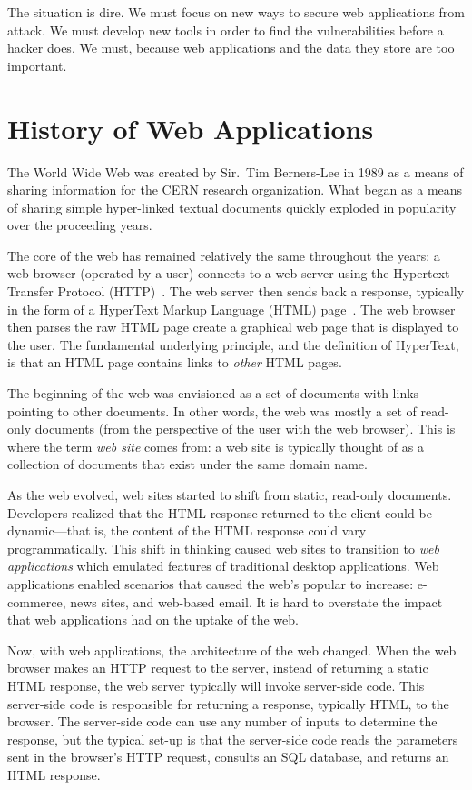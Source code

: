 The situation is dire. We must focus on new ways to secure web
applications from attack. We must develop new tools in order to find
the vulnerabilities before a hacker does. We must, because web
applications and the data they store are too important.

\section{History of Web Applications}

The World Wide Web was created by Sir.\ Tim Berners-Lee in 1989 as a
means of sharing information for the CERN research organization. What
began as a means of sharing simple hyper-linked textual documents
quickly exploded in popularity over the proceeding years.

The core of the web has remained relatively the same throughout the
years: a web browser (operated by a user) connects to a web server
using the Hypertext Transfer Protocol (HTTP)~\cite{fielding99:http11}.
The web server then sends back a response, typically in the form of a
HyperText Markup Language (HTML) page~\cite{berjon14:html5}. The web
browser then parses the raw HTML page create a graphical web page that
is displayed to the user. The fundamental underlying principle, and
the definition of HyperText, is that an HTML page contains links to
\emph{other} HTML pages.

The beginning of the web was envisioned as a set of documents with
links pointing to other documents. In other words, the web was mostly
a set of read-only documents (from the perspective of the user with
the web browser). This is where the term \emph{web site} comes from: a
web site is typically thought of as a collection of documents that
exist under the same domain name.

As the web evolved, web sites started to shift from static, read-only
documents. Developers realized that the HTML response returned to the
client could be dynamic---that is, the content of the HTML response
could vary programmatically. This shift in thinking caused web sites to
transition to \emph{web applications} which emulated features of
traditional desktop applications. Web applications enabled scenarios
that caused the web's popular to increase: e-commerce, news sites, and
web-based email. It is hard to overstate the impact that web
applications had on the uptake of the web. 

Now, with web applications, the architecture of the web changed. When
the web browser makes an HTTP request to the server, instead of
returning a static HTML response, the web server typically will invoke
server-side code. This server-side code is responsible for returning a
response, typically HTML, to the browser. The server-side code can use
any number of inputs to determine the response, but the typical set-up
is that the server-side code reads the parameters sent in the
browser's HTTP request, consults an SQL database, and returns an HTML
response.

